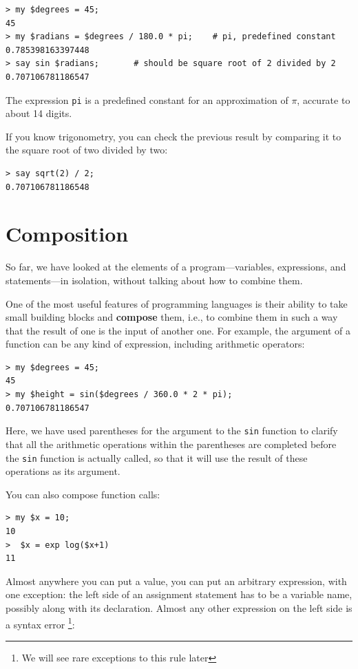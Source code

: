 \begin{verbatim}
> my $degrees = 45;
45
> my $radians = $degrees / 180.0 * pi;    # pi, predefined constant
0.785398163397448
> say sin $radians;       # should be square root of 2 divided by 2
0.707106781186547
\end{verbatim}
%
The expression {\tt pi} is a predefined constant for an
approximation of $\pi$, accurate to about 14 digits.

If you know
trigonometry, you can check the previous result by comparing it to
the square root of two divided by two:

\begin{verbatim}
> say sqrt(2) / 2;
0.707106781186548
\end{verbatim}
%

\section{Composition}

So far, we have looked at the elements of a program---variables,
expressions, and statements---in isolation, without talking about how to combine them.

One of the most useful features of programming languages is their
ability to take small building blocks and {\bf compose} them, i.e., 
to combine them in such a way that the result of one is the 
input of another one.  For example, the argument of a function 
can be any kind of expression, including arithmetic operators:

\begin{verbatim}
> my $degrees = 45;
45
> my $height = sin($degrees / 360.0 * 2 * pi);
0.707106781186547
\end{verbatim}
%
Here, we have used parentheses for the argument to the {\tt sin} 
function to clarify that all the arithmetic operations 
within the parentheses are completed before the {\tt sin} function 
is actually called, so that it will use the result of these operations 
as its argument. 

You can also compose function calls:

\begin{verbatim}
> my $x = 10;
10
>  $x = exp log($x+1)
11
\end{verbatim}
%
Almost anywhere you can put a value, you can put an arbitrary
expression, with one exception: the left side of an assignment
statement has to be a variable name, possibly along with its
declaration.  Almost any other expression on the left
side is a syntax error \footnote{We will see rare exceptions to this rule
later}:

